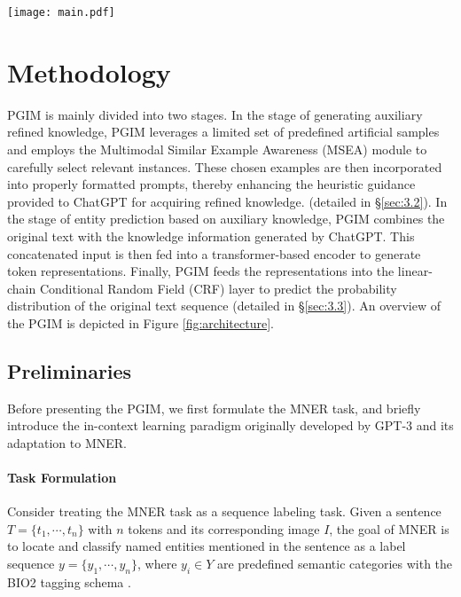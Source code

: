 \documentclass[11pt]{article}
\begin{document}
\begin{figure*}[t!]
	\centering
	\texttt{[image: main.pdf]}
	\caption{The architecture of PGIM.}
	\label{fig:architecture}
\end{figure*}
\section{Methodology}
PGIM is mainly divided into two stages. 
In the stage of generating auxiliary refined knowledge, PGIM leverages a limited set of predefined artificial samples and employs the Multimodal Similar Example Awareness (MSEA) module to carefully select relevant instances. These chosen examples are then incorporated into properly formatted prompts, thereby enhancing the heuristic guidance provided to ChatGPT for acquiring refined knowledge. (detailed in §\ref{sec:3.2}). 
In the stage of entity prediction based on auxiliary knowledge, PGIM combines the original text with the knowledge information generated by ChatGPT. This concatenated input is then fed into a transformer-based encoder to generate token representations.
Finally, PGIM feeds the representations into the linear-chain Conditional Random Field (CRF) \citep{lafferty2001conditional} layer to predict the probability distribution of the original text sequence (detailed in §\ref{sec:3.3}). An overview of the PGIM is depicted in Figure \ref{fig:architecture}.

\subsection{Preliminaries}
Before presenting the PGIM, we first formulate the MNER task, and briefly introduce the in-context learning paradigm originally developed by GPT-3 \citep{brown2020language} and its adaptation to MNER.

\paragraph{Task Formulation} 
Consider treating the MNER task as a sequence labeling task. Given a sentence $T = \{t_1, \cdots, t_n\}$ with $n$ tokens and its corresponding image $I$, the goal of MNER is to locate and classify named entities mentioned in the sentence as a label sequence $y = \{y_1, \cdots, y_n\}$, where $y_i \in Y$ are predefined semantic categories with the BIO2 tagging schema \citep{sang1999representing}.
\end{document}
